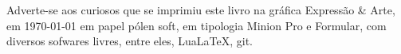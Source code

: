 \pagebreak


\ifodd\thepage\blankpage\fi

\mbox{}\vfill
\thispagestyle{empty}

\begin{center}
		\begin{minipage}{.7\textwidth}\tiny\noindent{}
		\centering\tiny
		Adverte-se aos curiosos que se imprimiu este 
		livro na gráfica Expressão \& Arte, 
		em \today{} em papel pólen soft, em tipologia Minion Pro e Formular, 
		com diversos sofwares livres, 
		entre eles, Lua\LaTeX, git.\\ 
		\medskip\\\
		\end{minipage}
\end{center}
